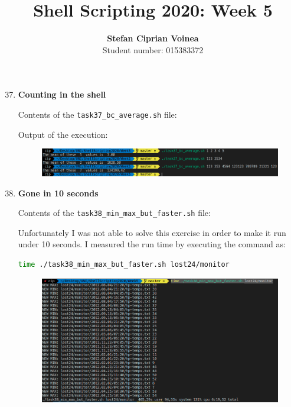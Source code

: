 \documentclass[9pt]{article}
\begin{document}
\title{Shell Scripting 2020: Week 5}
\author{\textbf{Stefan Ciprian Voinea}\\Student number: 015383372}
\maketitle


\begin{enumerate}
	
	\setcounter{enumi}{36}
	
	\item \textbf{Counting in the shell}
	
		Contents of the \texttt{task37\_bc\_average.sh} file:
	
		Output of the execution:
		\begin{figure}[h!]
			\centering
			\includegraphics[width=\linewidth]{img/task37.png}
		\end{figure}
	
	\newpage
	\item \textbf{Gone in 10 seconds}
	
		Contents of the \texttt{task38\_min\_max\_but\_faster.sh} file:
	
		Unfortunately I was not able to solve this exercise in order to make it run under 10 seconds.
		I measured the run time by executing the command as:
		\begin{lstlisting}[language=bash]
time ./task38_min_max_but_faster.sh lost24/monitor
		\end{lstlisting}
	
		\begin{figure}[h!]
			\centering
			\includegraphics[width=\linewidth-3.45cm]{img/task38_1.png}
		\end{figure}
	

\end{enumerate}
\end{document}
